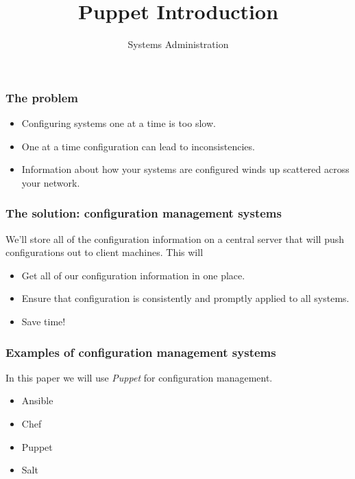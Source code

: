 \documentclass[10pt]{beamer}
\title{Puppet Introduction}
\author[IN719]{Systems Administration}
\institute[Otago Polytechnic]{
  Otago Polytechnic \\
  Dunedin, New Zealand \\
}
\date{}
\begin{document}
\begin{frame}[plain]
  \titlepage
\end{frame}

\begin{frame}
  \frametitle{The problem}

 \begin{itemize}
  \item Configuring systems one at a time is too slow.
  \item One at a time configuration can lead to inconsistencies.
  \item Information about how your systems are configured winds up scattered across your network.
  \end{itemize}



\end{frame}

\begin{frame}
  \frametitle{The solution: configuration management systems}

  We'll store all of the configuration information on a central server that will push configurations out to 
  client machines.  This will
  
  \begin{itemize}
  \item Get all of our configuration information in one place.
  \item Ensure that configuration is consistently and promptly applied to all systems.
  \item Save time!
  \end{itemize}

\end{frame}

\begin{frame}
  \frametitle{Examples of configuration management systems}

  In this paper we will use \emph{Puppet} for configuration management.
  
  \begin{itemize}
  \item Ansible
  \item Chef
  \item Puppet
  \item Salt
  \end{itemize}

\end{frame}
\end{document}
